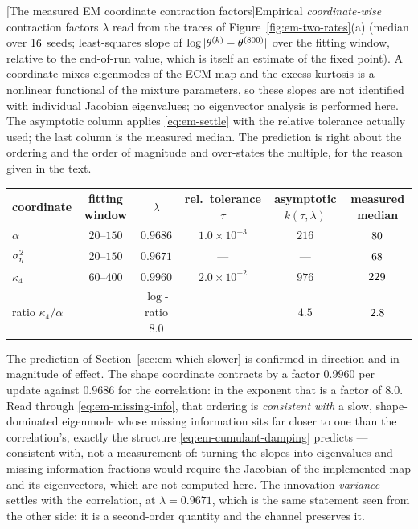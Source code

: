 \begin{center}
\begin{minipage}{\linewidth}\centering
{}[The measured EM coordinate contraction factors]{Empirical
\emph{coordinate-wise} contraction
factors $\lambda$ read from the traces of Figure~\ref{fig:em-two-rates}(a)
(median over $16$ seeds; least-squares slope of
$\log|\theta^{(k)}-\theta^{(800)}|$ over the fitting window, relative
to the end-of-run value, which is itself an estimate of the fixed point). A
coordinate mixes eigenmodes of the ECM map and the excess kurtosis is a
nonlinear functional of the mixture parameters, so these slopes are not
identified with individual Jacobian eigenvalues; no eigenvector analysis is
performed here. The
asymptotic column applies \eqref{eq:em-settle} with the relative tolerance
actually used; the last column is the measured median. The prediction is right
about the ordering and the order of magnitude and over-states the multiple,
for the reason given in the text.}
\label{tab:em-rates}
\small
\setlength{\tabcolsep}{4pt}
\begin{tabular}{@{}lccccc@{}}
\toprule
coordinate & fitting window & $\lambda$ & rel.\ tolerance $\tau$
  & asymptotic $k(\tau,\lambda)$ & measured median \\
\midrule
$\alpha$          & $20$--$150$ & $0.9686$ & $1.0\times10^{-3}$ & $216$  & $80$ \\
$\sigma_\eta^2$           & $20$--$150$ & $0.9671$ & ---                & ---    & $68$ \\
$\kappa_4$        & $60$--$400$ & $0.9960$ & $2.0\times10^{-2}$ & $976$  & $229$ \\
\midrule
ratio $\kappa_4 / \alpha$ & & $\log$-ratio $8.0$ & & $4.5$ & $2.8$ \\
\bottomrule
\end{tabular}
\end{minipage}
\end{center}

The prediction of Section~\ref{sec:em-which-slower} is confirmed in direction
and in magnitude of effect. The shape coordinate contracts by a factor
$0.9960$ per update against $0.9686$ for the correlation: in the exponent that
is a factor of $8.0$. Read through \eqref{eq:em-missing-info}, that ordering
is \emph{consistent with} a slow, shape-dominated eigenmode whose missing
information sits far closer to one than the correlation's, exactly the
structure \eqref{eq:em-cumulant-damping} predicts --- consistent with, not a
measurement of: turning the slopes into eigenvalues and missing-information
fractions would require the Jacobian of the implemented map and its
eigenvectors, which are not computed here.
The innovation \emph{variance} settles with the correlation, at
$\lambda = 0.9671$, which is the same statement seen from the other side: it is
a second-order quantity and the channel preserves it.

